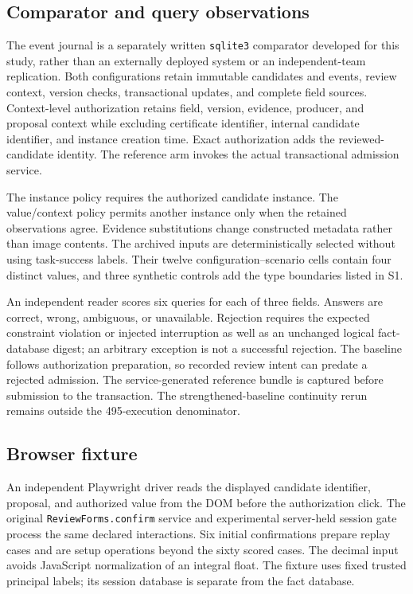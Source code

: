 \documentclass[11pt,a4paper]{article}
\newcommand{\code}[1]{\nolinkurl{#1}}
\begin{document}
\subsection{Comparator and query observations}

The event journal is a separately written \code{sqlite3} comparator developed for this study, rather than an externally deployed system or an independent-team replication. Both configurations retain immutable candidates and events, review context, version checks, transactional updates, and complete field sources. Context-level authorization retains field, version, evidence, producer, and proposal context while excluding certificate identifier, internal candidate identifier, and instance creation time. Exact authorization adds the reviewed-candidate identity. The reference arm invokes the actual transactional admission service.

The instance policy requires the authorized candidate instance. The value/context policy permits another instance only when the retained observations agree. Evidence substitutions change constructed metadata rather than image contents. The archived inputs are deterministically selected without using task-success labels. Their twelve configuration--scenario cells contain four distinct values, and three synthetic controls add the type boundaries listed in S1.

An independent reader scores six queries for each of three fields. Answers are correct, wrong, ambiguous, or unavailable. Rejection requires the expected constraint violation or injected interruption as well as an unchanged logical fact-database digest; an arbitrary exception is not a successful rejection. The baseline follows authorization preparation, so recorded review intent can predate a rejected admission. The service-generated reference bundle is captured before submission to the transaction. The strengthened-baseline continuity rerun remains outside the 495-execution denominator.

\subsection{Browser fixture}

An independent Playwright driver reads the displayed candidate identifier, proposal, and authorized value from the DOM before the authorization click. The original \code{ReviewForms.confirm} service and experimental server-held session gate process the same declared interactions. Six initial confirmations prepare replay cases and are setup operations beyond the sixty scored cases. The decimal input avoids JavaScript normalization of an integral float. The fixture uses fixed trusted principal labels; its session database is separate from the fact database.
\end{document}
